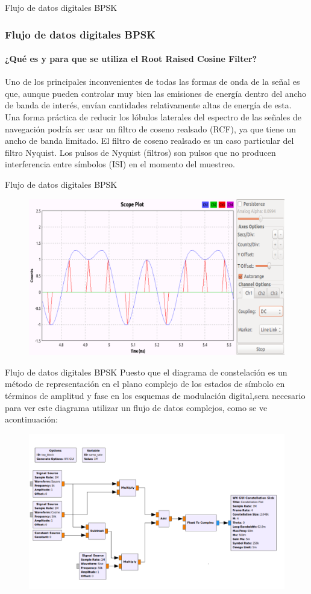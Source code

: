 \begin{frame}{Flujo de datos digitales BPSK}
\frametitle{Flujo de datos digitales BPSK}
\framesubtitle{¿Qué es y para que se utiliza el Root Raised Cosine Filter?}
\justifying
Uno de los principales inconvenientes de todas las formas de onda de la señal es que, aunque pueden controlar muy bien las emisiones de energía dentro del ancho de banda de interés, envían cantidades relativamente altas de energía de esta. Una forma práctica de reducir los lóbulos laterales del espectro de las señales de navegación podría ser usar un filtro de coseno realsado (RCF), ya que tiene un ancho de banda limitado. El filtro de coseno realsado es un caso particular del filtro Nyquist. Los pulsos de Nyquist (filtros) son pulsos que no producen interferencia entre símbolos (ISI) en el momento del muestreo.
\end{frame}
\begin{frame}{Flujo de datos digitales BPSK}
\begin{figure}
\includegraphics[width=.9\textwidth]{parte1/lab5/pdf/lab5_4.pdf}
\end{figure}
\end{frame}
\begin{frame}{Flujo de datos digitales BPSK}
\justifying
Puesto que el diagrama de constelación es un método de representación en el plano complejo de los estados de símbolo en términos de amplitud y fase en los esquemas de modulación digital,sera necesario para ver este diagrama  utilizar un flujo de datos complejos, como se ve acontinuación:
\begin{figure}
\includegraphics[width=.9\textwidth]{parte1/lab5/pdf/lab5_5.pdf}
\end{figure}
\end{frame}
